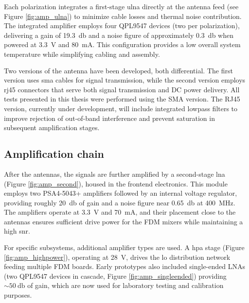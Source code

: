Each polarization integrates a first-stage \gls{ulna} directly at the antenna feed (see Figure \ref{fig:amp_ulna}) to minimize cable losses and thermal noise contribution. The integrated amplifier employs four QPL9547 \citep{QPL9547} devices (two per polarization), delivering a gain of \SI{19.3}{\decibel} and a noise figure of approximately \SI{0.3}{\decibel} when powered at \SI{3.3}{\volt} and \SI{80}{\milli\ampere}. This configuration provides a low overall system temperature while simplifying cabling and assembly.

Two versions of the antenna have been developed, both differential. The first version uses \gls{sma} cables for signal transmission, while the second version employs \gls{rj45} connectors that serve both signal transmission and DC power delivery. All tests presented in this thesis were performed using the SMA version. The RJ45 version, currently under development, will include integrated lowpass filters to improve rejection of out-of-band interference and prevent saturation in subsequent amplification stages.

\subsection{Amplification chain}
After the antennas, the signals are further amplified by a second-stage \gls{lna} (Figure \ref{fig:amp_second}), housed in the frontend electronics. This module employs two PSA4-5043+ \citep{PSA45043plus} amplifiers followed by an internal voltage regulator, providing roughly \SI{20}{\decibel} of gain and a noise figure near \SI{0.65}{\decibel} at \SI{400}{\mega\hertz}. The amplifiers operate at \SI{3.3}{\volt} and \SI{70}{\milli\ampere}, and their placement close to the antennas ensures sufficient drive power for the FDM mixers while maintaining a high \gls{snr}.

For specific subsystems, additional amplifier types are used. A \gls{hpa} stage (Figure \ref{fig:amp_highpower}), operating at \SI{28}{\volt}, drives the \gls{lo} distribution network feeding multiple FDM boards. Early prototypes also included single-ended LNAs (two QPL9547 devices in cascade, Figure \ref{fig:amp_singleended}) providing $\sim\SI{50}{\decibel}$ of gain, which are now used for laboratory testing and calibration purposes.

